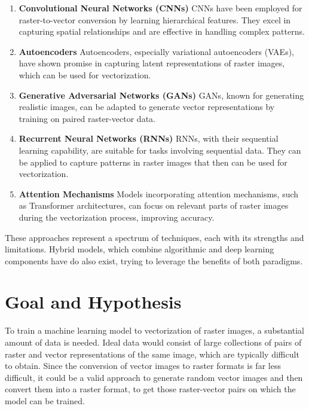 \documentclass[12pt, a4paper, titlepage]{report}
\begin{document}
\begin{enumerate}[label=\Roman*.]
   \item \textbf{Convolutional Neural Networks (CNNs)} CNNs have been employed for raster-to-vector conversion by learning hierarchical features. They excel in capturing spatial relationships and are effective in handling complex patterns.

   \item \textbf{Autoencoders} Autoencoders, especially variational autoencoders (VAEs), have shown promise in capturing latent representations of raster images, which can be used for vectorization.

   \item \textbf{Generative Adversarial Networks (GANs)} GANs, known for generating realistic images, can be adapted to generate vector representations by training on paired raster-vector data.

   \item \textbf{Recurrent Neural Networks (RNNs)} RNNs, with their sequential learning capability, are suitable for tasks involving sequential data. They can be applied to capture patterns in raster images that then can be used for vectorization.

   \item \textbf{Attention Mechanisms} Models incorporating attention mechanisms, such as Transformer architectures, can focus on relevant parts of raster images during the vectorization process, improving accuracy.
\end{enumerate}

These approaches represent a spectrum of techniques, each with its strengths and limitations. Hybrid models, which combine algorithmic and deep learning components have do also exist, trying to leverage the benefits of both paradigms.




\chapter{Goal and Hypothesis}

To train a machine learning model to vectorization of raster images, a substantial amount of data is needed. Ideal data would consist of large collections of pairs of raster and vector representations of the same image, which are typically difficult to obtain. Since the conversion of vector images to raster formats is far less difficult, it could be a valid approach to generate random vector images and then convert them into a raster format, to get those raster-vector pairs on which the model can be trained.
\end{document}
